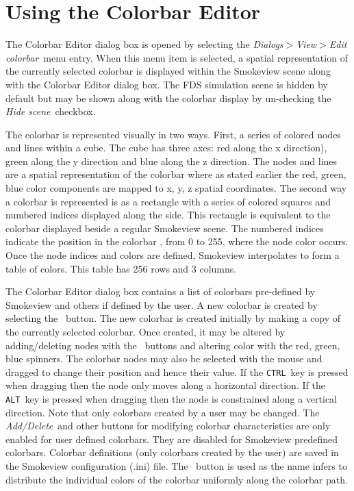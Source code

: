 \documentclass[11pt,twoside]{book}
\newcommand{\frameit}[1]{\fbox{\tt #1}}
\begin{document}
\section{Using the Colorbar Editor}
\label{section:colorbar}
The Colorbar Editor dialog box is opened by selecting the {\em
Dialogs$>$View$>$Edit colorbar}\ menu entry. When this menu item is
selected, a spatial representation of the currently selected
colorbar is displayed within the Smokeview scene along with the
Colorbar Editor dialog box.  The FDS simulation scene is hidden
by default but may be shown along with the colorbar display by
un-checking the {\em Hide scene}\ checkbox.

The colorbar is represented visually in two ways.  First, a series
of colored nodes and lines within a cube. The cube has three axes:
red along the x direction), green along the y direction and blue along the z direction.
The nodes and lines are a spatial representation of the colorbar where as
stated earlier the red, green, blue color components are mapped to x, y, z spatial
coordinates.
The second way a colorbar is represented is as a rectangle with a series of colored squares and numbered
indices
displayed along the side. This rectangle is equivalent to the colorbar
displayed beside a regular Smokeview scene.  The numbered indices indicate
the position in the colorbar , from 0 to 255, where the node color occurs.
Once the node indices and colors are defined, Smokeview interpolates to
form a table of colors. This table has  256 rows and 3 columns.

The Colorbar Editor dialog box contains a list of colorbars
pre-defined by Smokeview and others if defined by the user. A new
colorbar is created by selecting the \frameit{New}\ button. The
new colorbar is created initially by making a copy of the
currently selected colorbar. Once created, it may be altered by
adding/deleting nodes with the \frameit{Add/Delete}\ buttons and
altering color with the red, green, blue spinners. The colorbar
nodes may also be selected with the mouse and dragged to change
their position and hence their value. If the {\tt CTRL}\ key is
pressed when dragging then the node only moves along a horizontal
direction.  If the {\tt ALT}\ key is pressed when dragging then
the node is constrained along a vertical direction. Note that only
colorbars created by a user may be changed. The {\em Add/Delete}\
and other buttons for modifying colorbar characteristics are only
enabled for user defined colorbars.  They are disabled for
Smokeview predefined colorbars. Colorbar definitions (only
colorbars created by the user) are saved in the Smokeview
configuration (.ini) file.  The \frameit{Distribute nodes uniformly}\
button is used as the name infers to distribute the individual colors
of the colorbar uniformly along the colorbar path.
\end{document}
